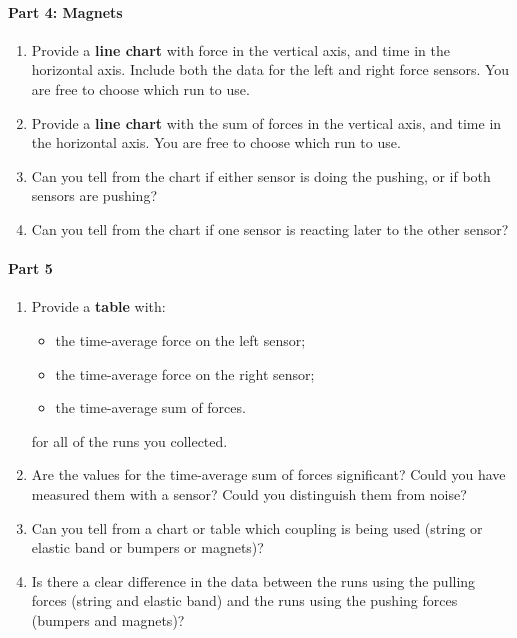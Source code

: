 \paragraph{Part 4: Magnets}
%
\begin{enumerate}
    \item Provide a \textbf{line chart} with force in the vertical axis, and time in the horizontal axis. Include both the data for the left and right force sensors. You are free to choose which run to use.
    \item Provide a \textbf{line chart} with the sum of forces in the vertical axis, and time in the horizontal axis. You are free to choose which run to use.
    \item Can you tell from the chart if either sensor is doing the pushing, or if both sensors are pushing?
    \item Can you tell from the chart if one sensor is reacting later to the other sensor?
\end{enumerate}
%
\paragraph{Part 5}
%
\begin{enumerate}
    \item Provide a \textbf{table} with:
    \begin{itemize}
        \item the time-average force on the left sensor;
        \item the time-average force on the right sensor;
        \item the time-average sum of forces.
    \end{itemize}
    for all of the runs you collected.
    \item Are the values for the time-average sum of forces significant? Could you have measured them with a sensor? Could you distinguish them from noise?
    \item Can you tell from a chart or table which coupling is being used (string or elastic band or bumpers or magnets)?
    \item Is there a clear difference in the data between the runs using the pulling forces (string and elastic band) and the runs using the pushing forces (bumpers and magnets)?
\end{enumerate}
%
\newpage
